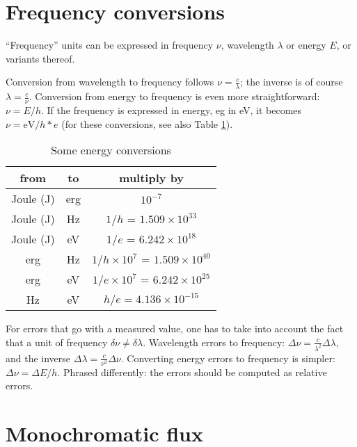 \documentclass[12pt,a4paper]{article}
\newcommand{\micron}{\ensuremath{\mu \mathrm{m}}}
\begin{document}
\section*{Frequency conversions}

``Frequency'' units can be expressed in frequency $\nu$, wavelength $\lambda$ or energy $E$, or variants thereof. 

Conversion from wavelength to frequency follows $\nu = \frac{c}{\lambda}$; the inverse is of course $\lambda = \frac{c}{\nu}$. Conversion from energy to frequency is even more straightforward: $\nu = E / h$. If the frequency is expressed in energy, eg in eV, it becomes $\nu = \mathrm{eV} / h * e$ (for these conversions, see also Table \ref{table:energyconversion}).

\begin{table}
\begin{tabular}{c|c|c}
from & to & multiply by \\
\hline
Joule (J) & erg & $10^{-7}$ \\
Joule (J) & Hz & $1/h$ = $1.509 \times 10^{33}$ \\
Joule (J) & eV & $1/e$ = $6.242 \times 10^{18}$ \\
erg & Hz & $1/h \times 10^7$ = $1.509 \times 10^{40}$ \\
erg & eV & $1/e \times 10^7$ = $6.242 \times 10^{25}$ \\
Hz & eV & $h / e = 4.136 \times 10^{-15}$ \\
\end{tabular}
\caption{\label{table:energyconversion}
Some energy conversions}
\end{table}



For errors that go with a measured value, one has to take into account the fact that a unit of frequency $\delta \nu \neq \delta \lambda$. Wavelength errors to frequency: $\Delta \nu = \frac{c}{\lambda^2} \Delta \lambda$, and the inverse $\Delta \lambda = \frac{c}{\nu^2} \Delta \nu$. Converting energy errors to frequency is simpler: $\Delta \nu = \Delta E / h$. Phrased differently: the errors should be computed as relative errors.


\section*{Monochromatic flux}
\end{document}
